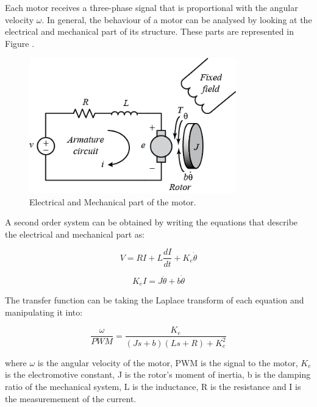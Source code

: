 Each motor receives a three-phase signal that is proportional with the angular velocity $\omega$. In general, the behaviour of a motor can be analysed by looking at the electrical and mechanical part of its structure. These parts are represented in Figure \label{dc}. 

\begin{figure}[H]
  \centering
    \includegraphics[width=0.8\textwidth]{images/dc.png}
	\caption{Electrical and Mechanical part of the motor.}
	\label{dc}
\end{figure}


A second order system can be obtained by writing the equations that describe the electrical and mechanical part as:

\begin{equation}
	V=RI+L\frac{dI}{dt}+K_{e}\dot{\theta}
\end{equation}

\begin{equation}
   K_{e}I = J \ddot{\theta}+b\dot{\theta}
\end{equation}

The transfer function can be taking the Laplace transform of each equation and manipulating it into:

\begin{equation}
\label{modelm} 
   \frac{\omega}{PWM}=\frac{K_{e}}{(Js+b)(Ls+R)+K_{e}^{2}}
\end{equation}

where $\omega$ is the angular velocity of the motor, PWM is the signal to the motor, $K_{e}$ is the electromotive constant, J is the rotor's moment of inertia, b is the damping ratio of the mechanical system, L is the inductance, R is the resistance and I is the measuremement of the current.

